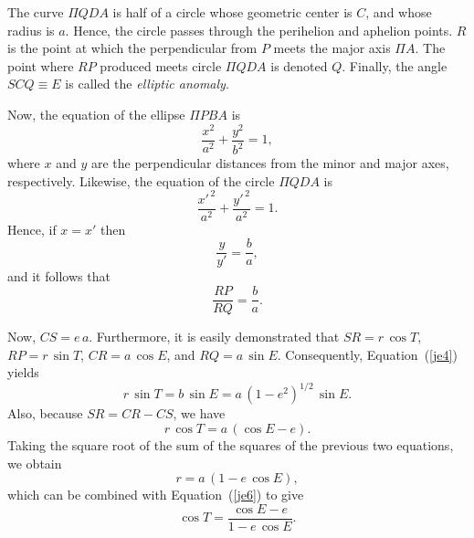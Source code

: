 The curve $\Pi QDA$ is half of a circle whose geometric center is $C$, and whose
radius is $a$. Hence, the circle passes through the perihelion and aphelion
points. $R$ is the point at which the perpendicular from $P$ 
meets the major axis $\Pi A$. The point where $RP$ produced
meets circle $\Pi QDA$ is denoted $Q$. Finally,
the angle $SCQ\equiv E$ is called the {\em elliptic anomaly}. 

Now, the equation of the ellipse $\Pi PBA$ is
\begin{equation}
\frac{x^2}{a^2}+ \frac{y^2}{b^2} = 1,
\end{equation}
where $x$ and $y$ are the perpendicular distances from the minor and major
axes, respectively. Likewise, the equation of the circle $\Pi QDA$ is
\begin{equation}
\frac{x'^{\,2}}{a^2} + \frac{y'^{\,2}}{a^2} = 1.
\end{equation}
Hence, if $x=x'$ then
\begin{equation}
\frac{y}{y'} = \frac{b}{a},
\end{equation}
and it follows that
\begin{equation}\label{je4}
\frac{RP}{RQ} = \frac{b}{a}.
\end{equation}

Now, $CS = e\,a$. Furthermore, it is easily demonstrated that
 $SR=r\,\cos T$, $RP=r\,\sin T$, $CR= a\,\cos E$, and $RQ= a\,\sin E$. Consequently, Equation~(\ref{je4}) yields
\begin{equation}\label{je5}
r\,\sin T = b\,\sin E = a\,(1-e^2)^{1/2}\,\sin E.
\end{equation}
Also, because $SR = CR-CS$, we have
\begin{equation}\label{je6}
r\,\cos T = a\,(\cos E - e).
\end{equation}
Taking the square root of the sum of the squares of the previous two equations, we obtain
\begin{equation}\label{je7}
r = a\,(1-e\,\cos E),
\end{equation}
which can be combined with Equation~(\ref{je6}) to give
\begin{equation}
\cos T = \frac{\cos E - e}{1-e\,\cos E}.
\end{equation}

